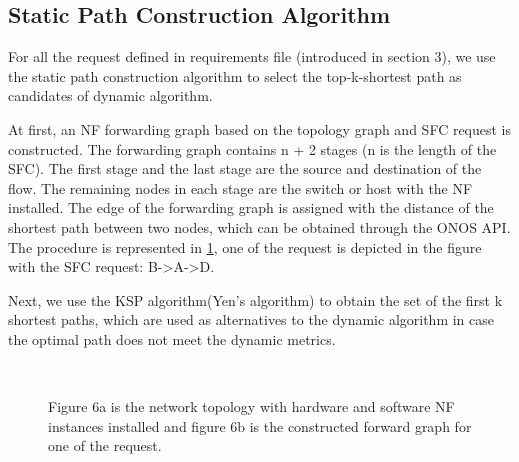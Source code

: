 \documentclass[10pt, conference, letterpaper]{IEEEtran}
\begin{document}
\subsection{Static Path Construction Algorithm}
For all the request defined in requirements file (introduced in section 3), we use the static path construction algorithm to select the top-k-shortest path as candidates of dynamic algorithm.

At first, an NF forwarding graph based on the topology graph and SFC request is constructed.
The forwarding graph contains n + 2 stages (n is the length of the SFC). The first stage and the last stage are the source and destination of the flow. The remaining nodes in each stage are the switch or host with the NF installed. The edge of the forwarding graph is assigned with the distance of the shortest path between two nodes, which can be obtained through the ONOS API. The procedure is represented in \ref{construct}, one of the request is depicted in the figure with the SFC request: B->A->D.

Next, we use the KSP algorithm(Yen's algorithm) to obtain the set of the first k shortest paths, which are used as alternatives to the dynamic algorithm in case the optimal path does not meet the dynamic metrics.


\begin{figure}  
\centering  
{}  
\label{2a}\hfill  
{}  
\label{2b}\\
\caption{Figure 6a is the network topology with hardware and software NF instances installed and figure 6b is the constructed forward graph for one of the request.}  
\label{construct}  
\end{figure} 
\end{document}
